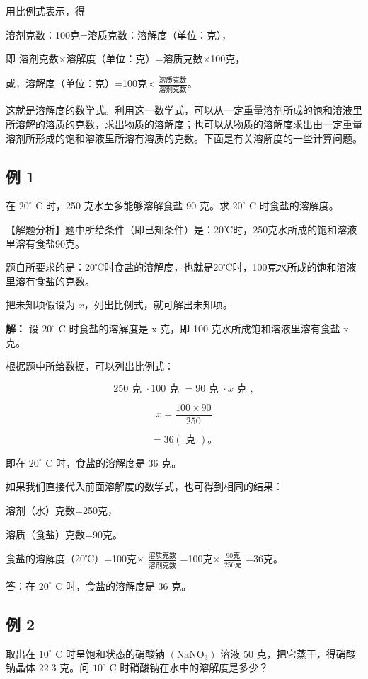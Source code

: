 用比例式表示，得

溶剂克数：100克=溶质克数：溶解度（单位：克），

即 溶剂克数×溶解度（单位：克）=溶质克数×100克，

或，溶解度（单位：克）=100克×
\(\frac{\text{溶质克数}}{\text{溶剂克数}}\)。

这就是溶解度的数学式。利用这一数学式，可以从一定重量溶剂所成的饱和溶液里所溶解的溶质的克数，求出物质的溶解度；也可以从物质的溶解度求出由一定重量溶剂所形成的饱和溶液里所溶有溶质的克数。下面是有关溶解度的一些计算问题。

\subsection{例 1}

在 \(20^{\circ}\) C 时，250 克水至多能够溶解食盐 90 克。求
\(20^{\circ}\) C 时食盐的溶解度。

【解题分析】题中所给条件（即已知条件）是：20℃时，250克水所成的饱和溶液里溶有食盐90克。

题自所要求的是：20℃时食盐的溶解度，也就是20℃时，100克水所成的饱和溶液里溶有食盐的克数。

把未知项假设为 \(x\)，列出比例式，就可解出未知项。

\textbf{解：} 设 \(20^{\circ}\) C 时食盐的溶解度是 x 克，即 100
克水所成饱和溶液里溶有食盐 x 克。

根据题中所给数据，可以列出比例式：

\[
250 \text{ 克 } \cdot 100 \text{ 克 } = 90 \text{ 克 } \cdot x \text{ 克 },
\]

\[
x = \frac {100 \times 90}{250}
\]

\[
= 36 (\text{ 克 })\text{。}
\]

即在 \(20^{\circ}\) C 时，食盐的溶解度是 36 克。

如果我们直接代入前面溶解度的数学式，也可得到相同的结果：

溶剂（水）克数=250克，

溶质（食盐）克数=90克。

食盐的溶解度（20℃）=100克× \(\frac{\text{溶质克数}}{\text{溶剂克数}}\)
=100克× \(\frac{90\text{克}}{250\text{克}}\) =36克。

答：在 \(20^{\circ}\) C 时，食盐的溶解度是 36 克。

\subsection{例 2}

取出在 \(10^{\circ}\) C 时呈饱和状态的硝酸钠
\(\left(\mathrm{NaNO}_{3}\right)\) 溶液 50 克，把它蒸干，得硝酸钠晶体
22.3 克。问 \(10^{\circ}\) C 时硝酸钠在水中的溶解度是多少？

